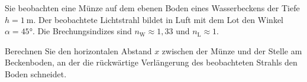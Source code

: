 \begin{ExerciseBlock}
Sie beobachten eine Münze auf dem ebenen Boden eines Wasserbeckens der Tiefe $h=\qty{1}{\metre}$. Der beobachtete Lichtstrahl bildet in Luft mit dem Lot den Winkel $\alpha=\ang{45}$. Die Brechungsindizes sind $n_\mathrm W\approx1{,}33$ und $n_\mathrm L\approx1$.
\begin{center}
\end{center}
Berechnen Sie den horizontalen Abstand $x$ zwischen der Münze und der Stelle am Beckenboden, an der die rückwärtige Verlängerung des beobachteten Strahls den Boden schneidet.
\end{ExerciseBlock}
